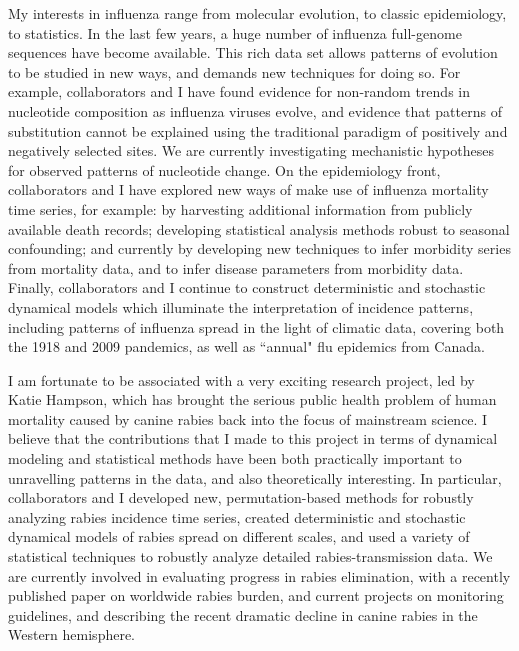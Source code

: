\documentclass[12pt,a4paper]{article}
\begin{document}
My interests in influenza range from molecular evolution, to classic epidemiology, to statistics.  In the last few years, a huge number of influenza full-genome sequences have become available.  This rich data set allows patterns of evolution to be studied in new ways, and demands new techniques for doing so.  For example, collaborators and I have found evidence for non-random trends in nucleotide composition as influenza viruses evolve, and evidence that patterns of substitution cannot be explained using the traditional paradigm of positively and negatively selected sites.  We are currently investigating mechanistic hypotheses for observed patterns of nucleotide change.  On the epidemiology front, collaborators and I have explored new ways of make use of influenza mortality time series, for example: by harvesting additional information from publicly available death records; developing statistical analysis methods robust to seasonal confounding; and currently by developing new techniques to infer morbidity series from mortality data, and to infer disease parameters from morbidity data.  Finally, collaborators and I continue to construct deterministic and stochastic dynamical models which illuminate the interpretation of incidence patterns, including patterns of influenza spread in the light of climatic data, covering both the 1918 and 2009 pandemics, as well as ``annual" flu epidemics from Canada.

I am fortunate to be associated with a very exciting research project, led by Katie Hampson, which has brought the serious public health problem of human mortality caused by canine rabies back into the focus of mainstream science.  I believe that the contributions that I made to this project in terms of dynamical modeling and statistical methods have been both practically important to unravelling patterns in the data, and also theoretically interesting.  In particular, collaborators and I developed new, permutation-based methods for robustly analyzing rabies incidence time series, created deterministic and stochastic dynamical models of rabies spread on different scales, and used a variety of statistical techniques to robustly analyze detailed rabies-transmission data. We are currently involved in evaluating progress in rabies elimination, with a recently published paper on worldwide rabies burden, and current projects on monitoring guidelines, and describing the recent dramatic decline in canine rabies in the Western hemisphere.
\end{document}
